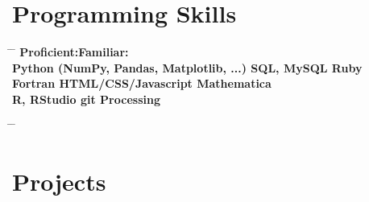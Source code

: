 \documentclass[10pt]{article} %
\begin{document}
\section{Programming Skills}
\parbox{0.5\textwidth}{ %
\begin{tabbing}
\hspace{3cm} \= \hspace{4cm} \= \kill
\bf{Proficient:\hspace{50mm}Familiar:} \\
\sqbullet\hspace{3mm}Python (NumPy, Pandas, Matplotlib, ...)  \hspace{1.7mm}\sqbullet\hspace{3mm}SQL, MySQL        \hspace{20mm}\sqbullet\hspace{3mm}Ruby\\
\sqbullet\hspace{3mm}Fortran                             \hspace{49.3mm}\sqbullet\hspace{3mm}HTML/CSS/Javascript \hspace{5.6mm}\sqbullet\hspace{3mm}Mathematica\\
\sqbullet\hspace{3mm}R, RStudio                          \hspace{44.9mm}\sqbullet\hspace{3mm}git                 \hspace{35mm}\sqbullet\hspace{3mm}Processing
\end{tabbing}}
\hfill %
\parbox{0.5\textwidth}{ %
\begin{tabbing}
\hspace{3cm} \= \hspace{4cm} \= \kill
\bf{}
\end{tabbing}}



\section{Projects}
\end{document}
